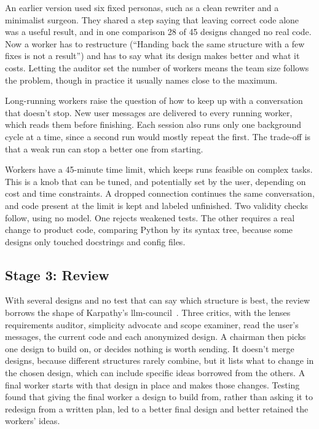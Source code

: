An earlier version used six fixed personas, such as a clean rewriter and a minimalist surgeon. They shared a step saying that leaving correct code alone was a useful result, and in one comparison 28 of 45 designs changed no real code. Now a worker has to restructure (``Handing back the same structure with a few fixes is not a result'') and has to say what its design makes better and what it costs. Letting the auditor set the number of workers means the team size follows the problem, though in practice it usually names close to the maximum.

Long-running workers raise the question of how to keep up with a conversation that doesn't stop. New user messages are delivered to every running worker, which reads them before finishing. Each session also runs only one background cycle at a time, since a second run would mostly repeat the first. The trade-off is that a weak run can stop a better one from starting.

Workers have a 45-minute time limit, which keeps runs feasible on complex tasks. This is a knob that can be tuned, and potentially set by the user, depending on cost and time constraints. A dropped connection continues the same conversation, and code present at the limit is kept and labeled unfinished. Two validity checks follow, using no model. One rejects weakened tests. The other requires a real change to product code, comparing Python by its syntax tree, because some designs only touched docstrings and config files.

\subsection{Stage 3: Review}

With several designs and no test that can say which structure is best, the review borrows the shape of Karpathy's llm-council~\cite{karpathy2025council}. Three critics, with the lenses requirements auditor, simplicity advocate and scope examiner, read the user's messages, the current code and each anonymized design. A chairman then picks one design to build on, or decides nothing is worth sending. It doesn't merge designs, because different structures rarely combine, but it lists what to change in the chosen design, which can include specific ideas borrowed from the others. A final worker starts with that design in place and makes those changes. Testing found that giving the final worker a design to build from, rather than asking it to redesign from a written plan, led to a better final design and better retained the workers' ideas.

